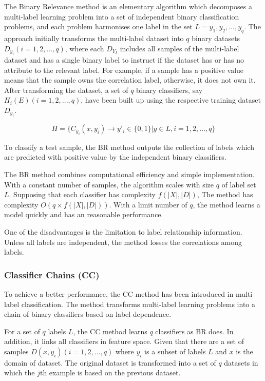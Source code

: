 The Binary Relevance method is an elementary algorithm which decomposes a multi-label learning problem into a set of independent binary classification problems, and each problem harmonises one label in the set $L = {y_{1}, y_{2},...,y_{q}}$. The approach initially transforms the multi-label dataset into $q$ binary datasets $D_{y_{i}} (i = 1,2,...,q)$, where each $D_{Y_{I}}$ includes all samples of the multi-label dataset and has a single binary label to instruct if the dataset has or has no attribute to the relevant label. For example, if a sample has a positive value means that the sample owns the correlation label, otherwise, it does not own it. After transforming the dataset, a set of $q$ binary classifiers, say $H_{i}(E) (i = 1,2,...,q)$, have been built up using the respective training dataset $D_{y_{i}}$. 

\begin{equation}\label{eq:BinaryRelevance}
H = \{C_{y_{i}}(x, y_{i}) \to y'_{i} \in \{0,1\}| y \in L, i = 1,2,...,q\}
\end{equation}

To classify a test sample, the BR method outputs the collection of labels which are predicted with positive value by the independent binary classifiers.

The BR method combines computational efficiency and simple implementation. With a constant number of samples, the algorithm scales with size $q$ of label set $L$. Supposing that each classifier has complexity $f(|X|,|D|)$, The method has complexity $O(q \times f(|X|,|D|))$. With a limit number of $q$, the method learns a model quickly and has an reasonable performance.

One of the disadvantages is the limitation to label relationship information. Unless all labels are independent, the method losses the correlations among labels.

\subsubsection{Classifier Chains (CC)}

To achieve a better performance, the CC method has been introduced in multi-label classification\citep{read2011classifier}. The method transforms multi-label learning problems into a chain of binary classifiers based on label dependence.

For a set of $q$ labels $L$, the CC method learns $q$ classifiers as BR does. In addition, it links all classifiers in feature space. Given that there are a set of samples $D(x,y_{i}) (i = 1,2,...,q)$ where $y_{i}$ is a subset of labels $L$ and $x$ is the domain of dataset. The original dataset is transformed into a set of $q$ datasets in which the $j$th example is based on the previous dataset.

